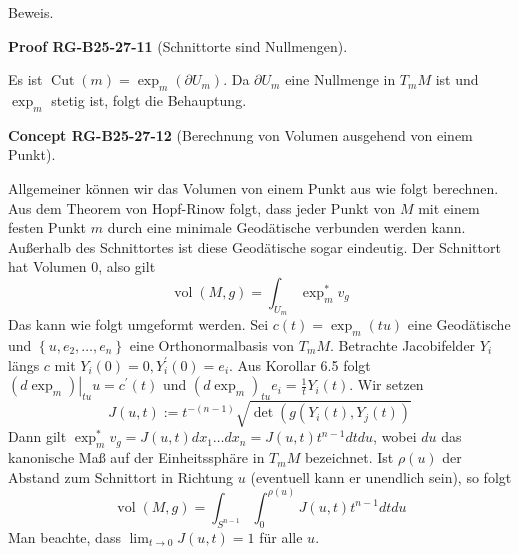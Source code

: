 \documentclass[10pt, letterpaper]{article}
\newcommand{\CustomHeading}[3]{%
  \par\medskip\noindent%
  \textbf{#1 #2} \textnormal{(#3)}.\enskip%
}
\newenvironment{CONC}[2]{\begin{unitbox}\CustomHeading{Concept}{#1}{#2}}{\end{unitbox}}
\newenvironment{PROOF}[2]{\begin{unitbox}\CustomHeading{Proof}{#1}{#2}}{\end{unitbox}}
\begin{document}
Beweis. 



\begin{PROOF}{RG-B25-27-11}{Schnittorte sind Nullmengen}
Es ist $\operatorname{Cut}(m)=\exp _{m}\left(\partial U_{m}\right)$. Da $\partial U_{m}$ eine Nullmenge in $T_{m} M$ ist und $\exp _{m}$ stetig ist, folgt die Behauptung.
\end{PROOF}





\begin{CONC}{RG-B25-27-12}{Berechnung von Volumen ausgehend von einem Punkt}
Allgemeiner können wir das Volumen von einem Punkt aus wie folgt berechnen. Aus dem Theorem von Hopf-Rinow folgt, dass jeder Punkt von $M$ mit einem festen Punkt $m$ durch eine minimale Geodätische verbunden werden kann. Außerhalb des Schnittortes ist diese Geodätische sogar eindeutig. Der Schnittort hat Volumen 0, also gilt
$$
\operatorname{vol}(M, g)=\int_{U_{m}} \exp _{m}^{*} v_{g}
$$
Das kann wie folgt umgeformt werden. Sei $c(t)=\exp _{m}(t u)$ eine Geodätische und $\left\{u, e_{2}, \ldots, e_{n}\right\}$ eine Orthonormalbasis von $T_{m} M$. Betrachte Jacobifelder $Y_{i}$ längs $c$ mit $Y_{i}(0)=0, Y_{i}^{\prime}(0)=e_{i}$. Aus Korollar 6.5 folgt $\left.\left(d \exp _{m}\right)\right|_{t u} u=c^{\prime}(t)$ und $\left(d \exp _{m}\right)_{t u} e_{i}=\frac{1}{t} Y_{i}(t)$. Wir setzen
$$
J(u, t):=t^{-(n-1)} \sqrt{\operatorname{det}\left(g\left(Y_{i}(t), Y_{j}(t)\right)\right.}
$$
Dann gilt $\exp _{m}^{*} v_{g}=J(u, t) d x_{1} \ldots d x_{n}=J(u, t) t^{n-1} d t d u$, wobei $d u$ das kanonische Maß auf der Einheitssphäre in $T_{m} M$ bezeichnet. Ist $\rho(u)$ der Abstand zum Schnittort in Richtung $u$ (eventuell kann er unendlich sein), so folgt
\begin{equation*}
\operatorname{vol}(M, g)=\int_{S^{n-1}} \int_{0}^{\rho(u)} J(u, t) t^{n-1} d t d u
\end{equation*}
Man beachte, dass $\lim _{t \rightarrow 0} J(u, t)=1$ für alle $u$.
\end{CONC}



\end{document}
